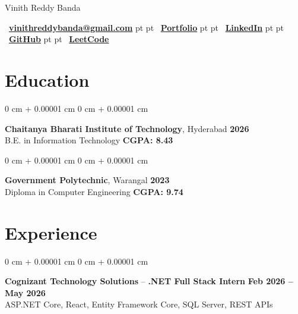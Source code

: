 \documentclass[10pt, letterpaper]{article}
\newenvironment{onecolentry}{
    \begin{adjustwidth}{
        0 cm + 0.00001 cm
    }{
        0 cm + 0.00001 cm
    }
}{
    \end{adjustwidth}
}
\newenvironment{header}{
    \setlength{\topsep}{0pt}\par\kern\topsep\centering\linespread{1.35}
}{
    \par\kern\topsep
}
\newcommand{\resumeName}[1]{{\fontsize{20 pt}{21 pt}\selectfont #1}}
\newcommand{\contactSep}{\kern 5.0 pt\textbar\kern 5.0 pt}
\newcommand{\muted}[1]{{\color{mutedColor}#1}}
\newcommand{\contactIcon}[1]{{\color{linkIconColor}#1}}
\newcommand{\entryTitle}[1]{\textbf{#1}}
\newcommand{\entryRole}[1]{\textbf{#1}}
\newcommand{\techStack}[1]{{\small\muted{#1}}}
\let\oldhref\href
\renewcommand{\href}[2]{\oldhref{#1}{\textbf{#2}}}
\begin{document}
\begin{header}
    \resumeName{Vinith Reddy Banda}

    \vspace{4 pt}

    \small
    \mbox{\contactIcon{\faEnvelope}\ \href{mailto:vinithreddybanda@gmail.com}{vinithreddybanda@gmail.com}}%
    \contactSep%
    \mbox{\contactIcon{\faGlobe}\ \href{https://vinithreddybanda.github.io}{Portfolio}}%
    \contactSep%
    \mbox{\contactIcon{\faLinkedin}\ \href{https://www.linkedin.com/in/vinithreddybanda}{LinkedIn}}%
    \contactSep%
    \mbox{\contactIcon{\faGithub}\ \href{https://github.com/vinithreddybanda}{GitHub}}%
    \contactSep%
    \mbox{\contactIcon{\faCode}\ \href{https://leetcode.com/u/vinithreddybanda/}{LeetCode}}%
\end{header}

\vspace{0.11 cm}

\section{Education}

\begin{onecolentry}
    \textbf{Chaitanya Bharati Institute of Technology}, Hyderabad \hfill \textbf{2026}\\
    \muted{B.E. in Information Technology} \hfill \textbf{CGPA: 8.43}
\end{onecolentry}

\vspace{0.11 cm}

\begin{onecolentry}
    \textbf{Government Polytechnic}, Warangal \hfill \textbf{2023}\\
    \muted{Diploma in Computer Engineering} \hfill \textbf{CGPA: 9.74}
\end{onecolentry}

\section{Experience}

\begin{onecolentry}
    \entryTitle{Cognizant Technology Solutions} -- \entryRole{.NET Full Stack Intern} \hfill \textbf{Feb 2026 -- May 2026}\\
    \techStack{ASP.NET Core, React, Entity Framework Core, SQL Server, REST APIs}
\end{onecolentry}
\end{document}
